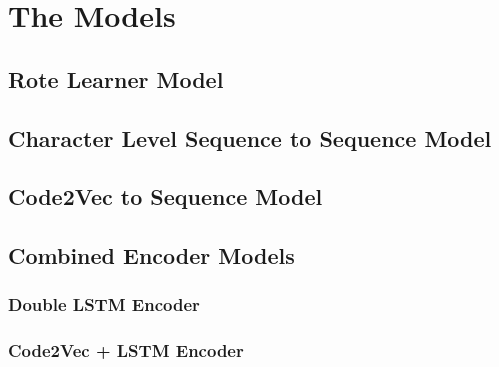\chapter{The Models}
\label{the_models}

\section{Rote Learner Model} %
\label{sec:rote_learner_model}


\section{Character Level Sequence to Sequence Model} %
\label{sec:character_level_sequence_to_sequence}


\section{Code2Vec to Sequence Model} %
\label{sec:code2vec_to_sequence_model}


\section{Combined Encoder Models} %
\label{sec:combined_encoder_models}

\subsection{Double LSTM Encoder} %
\label{sub:double_sequence_encoder}


\subsection{Code2Vec + LSTM Encoder} %
\label{sub:code2vec_sequence_to_sequence}

